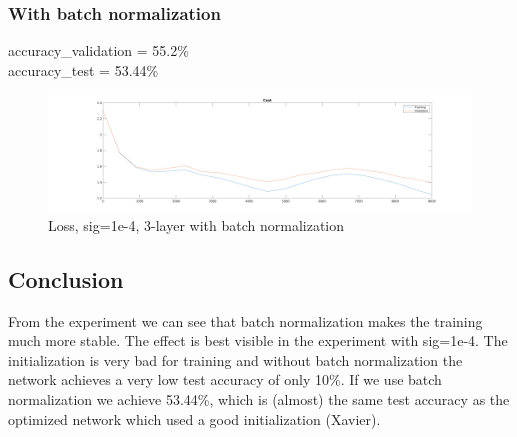 \subsubsection{With batch normalization}
accuracy\_validation = 55.2\%\\
accuracy\_test = 53.44\%
\begin{figure}[ht]
    \includegraphics[width=\textwidth]{../code/result_pics/cost_lambda=0.00500_ns=2250_cycles=2_k=3_sig=0.00010_bn=1.png}
    \caption{Loss, sig=1e-4, 3-layer with batch normalization}
\end{figure}
\clearpage
\subsection{Conclusion}
From the experiment we can see that batch normalization makes the training much more stable. The effect is best visible in the 
experiment with sig=1e-4. The initialization is very bad for training and without batch normalization the network achieves a
very low test accuracy of only 10\%. If we use batch normalization we achieve 53.44\%, which is (almost) the same test accuracy as the optimized network which 
used a good initialization (Xavier).




